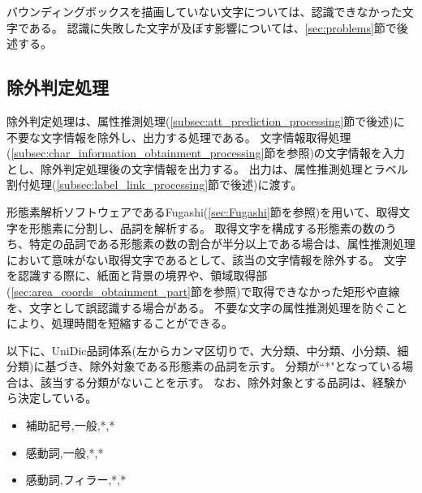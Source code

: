 バウンディングボックスを描画していない文字については、認識できなかった文字である。
認識に失敗した文字が及ぼす影響については、\ref{sec:problems}節で後述する。

\subsection{除外判定処理}\label{subsec:exclusion_judgement_processing}
除外判定処理は、属性推測処理(\ref{subsec:att_prediction_processing}節で後述)に不要な文字情報を除外し、出力する処理である。
文字情報取得処理(\ref{subsec:char_information_obtainment_processing}節を参照)の文字情報を入力とし、除外判定処理後の文字情報を出力する。
出力は、属性推測処理とラベル割付処理(\ref{subsec:label_link_processing}節で後述)に渡す。

形態素解析ソフトウェアであるFugashi(\ref{sec:Fugashi}節を参照)を用いて、取得文字を形態素に分割し、品詞を解析する。
取得文字を構成する形態素の数のうち、特定の品詞である形態素の数の割合が半分以上である場合は、属性推測処理において意味がない取得文字であるとして、該当の文字情報を除外する。
文字を認識する際に、紙面と背景の境界や、領域取得部(\ref{sec:area_coords_obtainment_part}節を参照)で取得できなかった矩形や直線を、文字として誤認識する場合がある。
不要な文字の属性推測処理を防ぐことにより、処理時間を短縮することができる。

以下に、UniDic品詞体系(左からカンマ区切りで、大分類、中分類、小分類、細分類)に基づき、除外対象である形態素の品詞を示す。
分類が``*"となっている場合は、該当する分類がないことを示す。
なお、除外対象とする品詞は、経験から決定している。

\begin{itemize}
    \item 補助記号,一般,*,*
    \item 感動詞,一般,*,*
    \item 感動詞,フィラー,*,*
\end{itemize}

